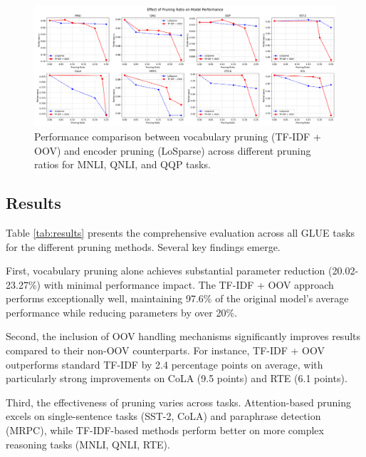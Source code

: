 \documentclass[twocolumn]{article}
\begin{document}
\begin{figure}[t]
    \centering
    \includegraphics[width=\linewidth]{images/pruning_ratios.png}
    \caption{Performance comparison between vocabulary pruning (TF-IDF + OOV) and encoder pruning (LoSparse) across different pruning ratios for MNLI, QNLI, and QQP tasks. }
    \label{fig:pruning_ratio}
\end{figure}

\subsection{Results}
Table \ref{tab:results} presents the comprehensive evaluation across all GLUE tasks for the different pruning methods. Several key findings emerge.

First, vocabulary pruning alone achieves substantial parameter reduction (20.02-23.27\%) with minimal performance impact. The TF-IDF + OOV approach performs exceptionally well, maintaining 97.6\% of the original model's average performance while reducing parameters by over 20\%.

Second, the inclusion of OOV handling mechanisms significantly improves results compared to their non-OOV counterparts. For instance, TF-IDF + OOV outperforms standard TF-IDF by 2.4 percentage points on average, with particularly strong improvements on CoLA (9.5 points) and RTE (6.1 points).

Third, the effectiveness of pruning varies across tasks. Attention-based pruning excels on single-sentence tasks (SST-2, CoLA) and paraphrase detection (MRPC), while TF-IDF-based methods perform better on more complex reasoning tasks (MNLI, QNLI, RTE).
\end{document}
